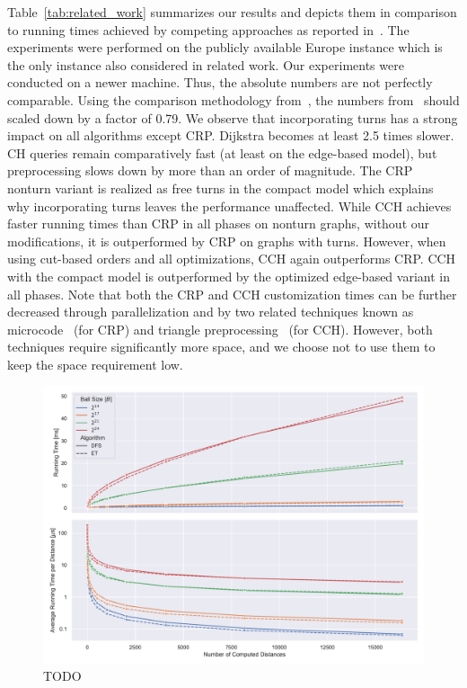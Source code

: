 \documentclass[a4paper, english, cleveref]{lipics-v2021}
\begin{document}
Table~\ref{tab:related_work} summarizes our results and depicts them in comparison to running times achieved by competing approaches as reported in~\cite{DellingGPW17}.
The experiments were performed on the publicly available Europe instance which is the only instance also considered in related work.
Our experiments were conducted on a newer machine.
Thus, the absolute numbers are not perfectly comparable.
Using the comparison methodology from~\cite{BastDGMPSWW16}, the numbers from~\cite{DellingGPW17} should scaled down by a factor of 0.79.
We observe that incorporating turns has a strong impact on all algorithms except CRP.
Dijkstra becomes at least 2.5 times slower.
CH queries remain comparatively fast (at least on the edge-based model), but preprocessing slows down by more than an order of magnitude.
The CRP nonturn variant is realized as free turns in the compact model which explains why incorporating turns leaves the performance unaffected.
While CCH achieves faster running times than CRP in all phases on nonturn graphs, without our modifications, it is outperformed by CRP on graphs with turns.
However, when using cut-based orders and all optimizations, CCH again outperforms CRP.
CCH with the compact model is outperformed by the optimized edge-based variant in all phases.
Note that both the CRP and CCH customization times can be further decreased through parallelization and by two related techniques known as microcode~\cite{DellingW13} (for CRP) and triangle preprocessing~\cite{DibbeltSW16} (for CCH).
However, both techniques require significantly more space, and we choose not to use them to keep the space requirement low.



\begin{figure}
\centering
\includegraphics[width=\linewidth]{fig/lazy_rphast_et_vs_dfs.pdf}
\caption{
TODO
}\label{fig:et_vs_dfs}
\end{figure}
\end{document}
